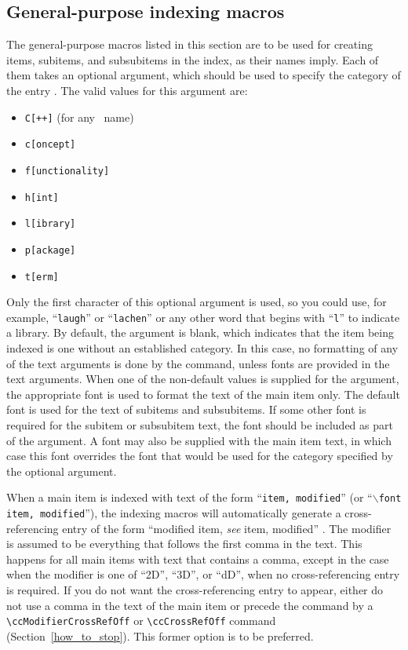 \documentclass{article}
\begin{document}
\subsection{General-purpose indexing macros}%
\label{generic_macros}

The general-purpose macros listed in this section are to be used for 
creating items, subitems, and subsubitems in the index, as their names imply. 
Each of them takes an optional argument, which should be used to
specify the category of the entry
.  The valid values for this argument are:
\begin{itemize}
   \item {\tt C[++]} (for any \CC\ name)
   \item {\tt c[oncept]} 
   \item {\tt f[unctionality]} 
   \item {\tt h[int]} 
   \item {\tt l[ibrary]} 
   \item {\tt p[ackage]} 
   \item {\tt t[erm]} 
\end{itemize}
Only the first character of this optional argument is used, so you could
use, for example, ``{\tt laugh}'' or ``{\tt lachen}'' or any other word that 
begins with ``{\tt l}'' to indicate a library.
By default, the argument is blank, which indicates that the
item being indexed is one without an established category.  In this
case, no formatting of any of the text arguments is done by the command,
unless fonts are provided in the text arguments.
When one of the non-default values is supplied for the argument, the
appropriate font is used to format the text
of the main item only.  The default font is used for the 
text of subitems
and subsubitems.  If some other font is required for 
the subitem or subsubitem
text, the font should be included as part of the argument.  A font may also
be supplied with the main item text, in which case this 
font overrides
the font that would be used for the category specified by the optional argument.

When a main item is indexed with text of the form ``{\tt item, modified}''
(or ``{\tt $\backslash$font item, modified}''),
the indexing macros will automatically generate a cross-referencing
entry of the form ``modified item, {\em see} item, modified''%
. 
The modifier is assumed to be everything that follows the first comma in
the text. This happens for all main items with text that contains a 
comma, except in the case when the modifier is one 
of ``2D'', ``3D'', or ``dD'', when no cross-referencing entry is 
required.  If you do not want the 
cross-referencing entry to appear, 
either do not use a comma in the text of the main item or precede
the command by a \verb|\ccModifierCrossRefOff| or \verb|\ccCrossRefOff|
command 
(Section~\ref{how_to_stop}).  This former option is to be preferred.
\end{document}
